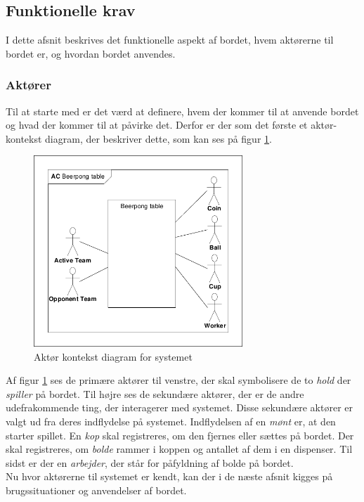\documentclass[Rapport/Rapport_main.tex]{subfiles}
\begin{document}
\subsection{Funktionelle krav}
I dette afsnit beskrives det funktionelle aspekt af bordet, hvem aktørerne til bordet er, og hvordan bordet anvendes.
\subsubsection{Aktører}
Til at starte med er det værd at definere, hvem der kommer til at anvende bordet og hvad der kommer til at påvirke det. Derfor er der som det første et aktør-kontekst diagram, der beskriver dette, som kan ses på figur \ref{fig:rap_actor_context}.
\begin{figure}[H]
    \centering
    \includegraphics[width=0.7\textwidth,trim={0.24in 0.24in 0.24in 0.24in},clip, page=1]{Kravspecifikation/Funktionelle_krav/graphics_funktionel/Krav-spec-diagrammer.pdf}
    \caption{Aktør kontekst diagram for systemet}
    \label{fig:rap_actor_context}
\end{figure}
Af figur \ref{fig:rap_actor_context} ses de primære aktører til venstre, der skal symbolisere de to \textit{hold} der \textit{spiller} på bordet. Til højre ses de sekundære aktører, der er de andre udefrakommende ting, der interagerer med systemet. Disse sekundære aktører er valgt ud fra deres indflydelse på systemet. Indflydelsen af en \textit{mønt} er, at den starter spillet. En \textit{kop} skal registreres, om den fjernes eller sættes på bordet. Der skal registreres, om \textit{bolde} rammer i koppen og antallet af dem i en dispenser. Til sidst er der en \textit{arbejder}, der står for påfyldning af bolde på bordet.\\
Nu hvor aktørerne til systemet er kendt, kan der i de næste afsnit kigges på brugssituationer og anvendelser af bordet.
\end{document}
